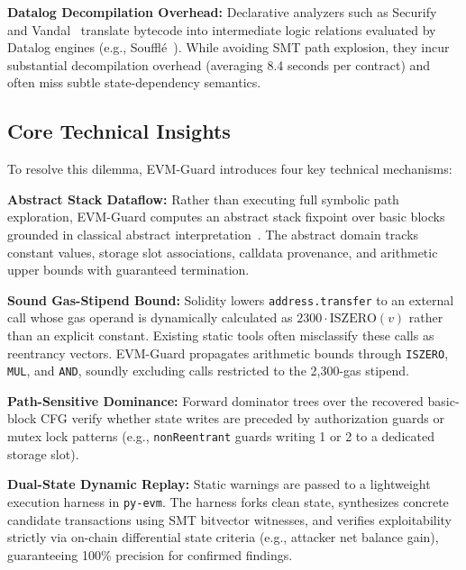 \documentclass[conference]{IEEEtran}
\begin{document}
\smallskip
\noindent\textbf{Datalog Decompilation Overhead:} Declarative analyzers such as Securify~\cite{tsankov2018securify} and Vandal~\cite{brent2018vandal} translate bytecode into intermediate logic relations evaluated by Datalog engines (e.g., Souffl{\'e}~\cite{scholz2016souffle}). While avoiding SMT path explosion, they incur substantial decompilation overhead (averaging 8.4 seconds per contract) and often miss subtle state-dependency semantics.

\subsection{Core Technical Insights}
To resolve this dilemma, EVM-Guard introduces four key technical mechanisms:

\smallskip
\noindent\textbf{Abstract Stack Dataflow:} Rather than executing full symbolic path exploration, EVM-Guard computes an abstract stack fixpoint over basic blocks grounded in classical abstract interpretation~\cite{cousot1977abstract}. The abstract domain tracks constant values, storage slot associations, calldata provenance, and arithmetic upper bounds with guaranteed termination.

\smallskip
\noindent\textbf{Sound Gas-Stipend Bound:} Solidity lowers \texttt{address.transfer} to an external call whose gas operand is dynamically calculated as $2300 \cdot \mathrm{ISZERO}(v)$ rather than an explicit constant. Existing static tools often misclassify these calls as reentrancy vectors. EVM-Guard propagates arithmetic bounds through \texttt{ISZERO}, \texttt{MUL}, and \texttt{AND}, soundly excluding calls restricted to the 2,300-gas stipend.

\smallskip
\noindent\textbf{Path-Sensitive Dominance:} Forward dominator trees over the recovered basic-block CFG verify whether state writes are preceded by authorization guards or mutex lock patterns (e.g., \texttt{nonReentrant} guards writing 1 or 2 to a dedicated storage slot).

\smallskip
\noindent\textbf{Dual-State Dynamic Replay:} Static warnings are passed to a lightweight execution harness in \texttt{py-evm}. The harness forks clean state, synthesizes concrete candidate transactions using SMT bitvector witnesses, and verifies exploitability strictly via on-chain differential state criteria (e.g., attacker net balance gain), guaranteeing 100\% precision for confirmed findings.
\end{document}
